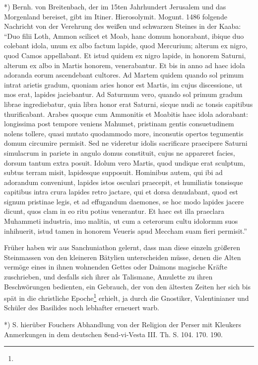 \documentclass[a4paper, 11pt, oneside, polutonikogreek, german]{article}
\begin{document}
*) Bernh. von Breitenbach, der im 15ten Jahrhundert Jerusalem und das Morgenland bereiset, gibt im Itiner. Hierosolymit. Mogunt. 1486 folgende Nachricht von der Verehrung des weißen und schwarzen Steines in der Kaaba: "`Duo filii Loth, Ammon scilicet et Moab, hanc domum honorabant, ibique duo colebant idola, unum ex albo factum lapide, quod Mercurium; alterum ex nigro, quod Camos appellabant. Et istud quidem ex nigro lapide, in honorem Saturni, alterum ex albo in Martis honorem, venerabantur. Et bis in anno ad haec idola adoranda eorum ascendebant cultores. Ad Martem quidem quando sol primum intrat arietis gradum, quoniam aries honor est Martis, im cujus discessione, ut mos erat, lapides jaciebantur. Ad Saturmum vero, quando sol primum gradum librae ingrediebatur, quia libra honor erat Saturni, sicque nudi ac tonsis capitibus thurificabant. Arabes quoque cum Ammonitis et Moabitis haec idola adorabant: longissima post tempore veniens Mahumet, pristinam gentis consuetudinem nolens tollere, quasi mutato quodammodo more, inconsutis opertos tegumentis domum circumire permisit. Sed ne videretur idolis sacrificare praecipere Saturni simulacrum in pariete in angulo domus constituit, cujus ne appareret facies, dorsum tantum extra posuit. Idolum vero Martis, quod undique erat sculptum, subtus terram misit, lapidesque supposuit. Hominibus autem, qui ibi ad adorandum conveniunt, lapides istos osculari praecepit, et humiliatis tonsisque capitibus intra crura lapides retro jactare, qui et dorsa denudabant, quod est signum pristinae legis, et ad effugandum daemones, se hoc modo lapides jacere dicunt, quos clam in eo ritu potius venerantur. Et haec est illa praeclara Muhammeti industria, imo malitia, ut cum a ceterorum cultu idolormm suos inhihuerit, istud tamen in honorem Veueris apud Meccham suam fieri permisit."'

Früher haben wir aus Sanchuniathon gelernt, dass man diese einzeln größeren Steinmassen von den kleineren Bätylien unterscheiden müsse, denen die Alten vermöge eines in ihnen wohnenden Gettes oder Daimons magische Kräfte zuschrieben, und desfalls sich ihrer als Talismane, Amulette zu ihren Beschwörungen bedienten, ein Gebrauch, der von den ältesten Zeiten her sich bis spät in die christliche Epoche\footnote{} erhielt, ja durch die Gnostiker, Valentinianer und Schüler des Basilides noch lebhafter erneuert warb.

*) S. hierüber Fouchers Abhandlung von der Religion der Perser mit Kleukers Anmerkungen in dem deutschen 8end-vi-Vesta III. Th. S. 104. 170. 190.
\end{document}

